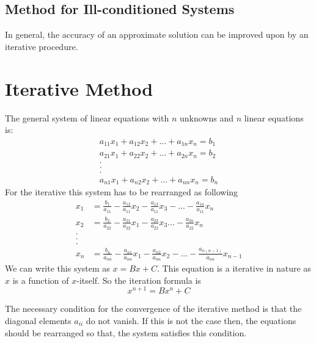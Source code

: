 \documentclass[aima203_lecturenotes_ku.tex]{subfiles}
\begin{document}
  \subsection{Method for Ill-conditioned Systems}
  In general, the accuracy of an approximate solution can be improved upon by an iterative procedure.

\section{Iterative Method}
The general system of linear equations with $n$ unknowns and $n$ linear equations is:
\begin{gather*}
    a_{11}x_1+a_{12}x_2+...+a_{1n}x_n=b_1 \\
    a_{21}x_1+a_{22}x_2+...+a_{2n}x_n=b_2 \\
    .\\
    .\\
    .\\
    a_{n1}x_1+a_{n2}x_2+...+a_{nn}x_n=b_n
  \end{gather*}
  For the iterative this system has to be rearranged as following
  \begin{align*}
    x_1 &= \frac{b_1}{a_{11}} - \frac{a_{12}}{a_{11}}x_2-\frac{a_{13}}{a_{11}}x_3-...-\frac{a_{1n}}{a_{11}}x_n \\
    x_2 &= \frac{b_2}{a_{22}} -\frac{a_{21}}{a_{22}}x_1-\frac{a_{23}}{a_{22}}x_3 ...-\frac{a_{2n}}{a_{22}}x_n \\
    .\\
    .\\
    .\\
    x_n &= \frac{b_n}{a_{nn}} - \frac{a_{n1}}{a_{nn}}x_1-\frac{a_{n2}}{a_{nn}}x_2-...-\frac{a_{n(n-1)}}{a_{nn}}x_{n-1}
  \end{align*}
  We can write this system as $x=Bx+C$. This equation is a iterative in nature as $x$ is a function of $x$-itself.
  So the iteration formula is
  \begin{equation}
    \label{simul}
    x^{n+1} = Bx^{n} + C
  \end{equation}
  \begin{mdframed}
    The necessary condition for the convergence of the iterative method is that the diagonal elements $a_{ii}$ do not vanish. If this is not the case then, the equations should be rearranged so that, the system satisfies this condition.
  \end{mdframed}
\end{document}
